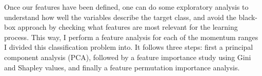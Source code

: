Once our features have been defined, one can do some exploratory analysis to understand how well the variables describe the target class, and avoid the black-box approach by checking what features are most relevant for the learning process. This way, I perform a feature analysis for each of the momentum ranges I divided this classification problem into. It follows three steps: first a principal component analysis (PCA), followed by a feature importance study using Gini and Shapley values, and finally a feature permutation importance analysis.

